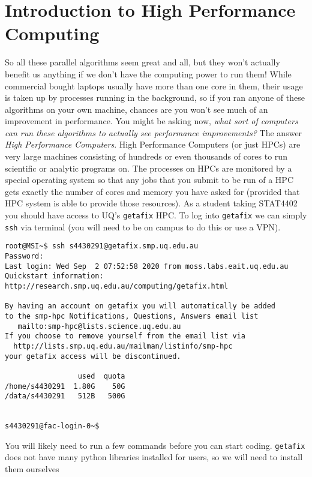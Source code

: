 \section{Introduction to High Performance Computing}

So all these parallel algorithms seem great and all, but they won't actually benefit us anything if we don't have the computing power to run them! While commercial bought laptops usually have more than one core in them, their usage is taken up by processes running in the background, so if you ran anyone of these algorithms on your own machine, chances are you won't see much of an improvement in performance. You might be asking now, {\it what sort of computers can run these algorithms to actually see performance improvements?} The answer {\it High Performance Computers}. High Performance Computers (or just HPCs) are very large machines consisting of hundreds or even thousands of cores to run scientific or analytic programs on. The processes on HPCs are monitored by a special operating system so that any jobs that you submit to be run of a HPC gets exactly the number of cores and memory you have asked for (provided that HPC system is able to provide those resources). As a student taking STAT4402 you should have access to UQ's \texttt{getafix} HPC. To log into \texttt{getafix} we can simply \texttt{ssh} via terminal (you will need to be on campus to do this or use a VPN).
\begin{verbatim}
root@MSI~$ ssh s4430291@getafix.smp.uq.edu.au
Password:
Last login: Wed Sep  2 07:52:58 2020 from moss.labs.eait.uq.edu.au
Quickstart information: http://research.smp.uq.edu.au/computing/getafix.html

By having an account on getafix you will automatically be added
to the smp-hpc Notifications, Questions, Answers email list
   mailto:smp-hpc@lists.science.uq.edu.au
If you choose to remove yourself from the email list via
  http://lists.smp.uq.edu.au/mailman/listinfo/smp-hpc
your getafix access will be discontinued.

                 used  quota
/home/s4430291  1.80G    50G
/data/s4430291   512B   500G


s4430291@fac-login-0~$
\end{verbatim}

You will likely need to run a few commands before you can start coding. \texttt{getafix} does not have many python libraries installed for users, so we will need to install them ourselves

